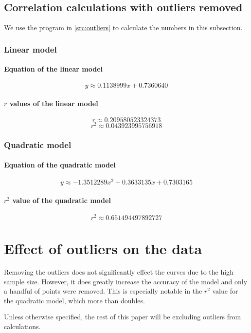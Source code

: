 \subsection{Correlation calculations with outliers removed}
We use the program in \vref{src:outliers} to calculate the numbers in this subsection.

\subsubsection{Linear model}
\paragraph{Equation of the linear model}
\[y \approx 0.1138999x + 0.7360640\]
\paragraph{$r$ values of the linear model}
\[r \approx \num{0.209580523324373}\]
\[r^2 \approx \num{0.043923995756918}\]

\subsubsection{Quadratic model}
\paragraph{Equation of the quadratic model}
\[y \approx -1.3512289x^2 + 0.3633135x + 0.7303165\]
\paragraph{$r^2$ value of the quadratic model}
\[r^2 \approx \num{0.651494497892727}\]

\section{Effect of outliers on the data}
Removing the outliers does not significantly effect the curves due to the high sample size.
However, it does greatly increase the accuracy of the model and only a handful of points were removed.
This is especially notable in the $r^2$ value for the quadratic model, which more than doubles.

Unless otherwise specified, the rest of this paper will be excluding outliers from calculations.
